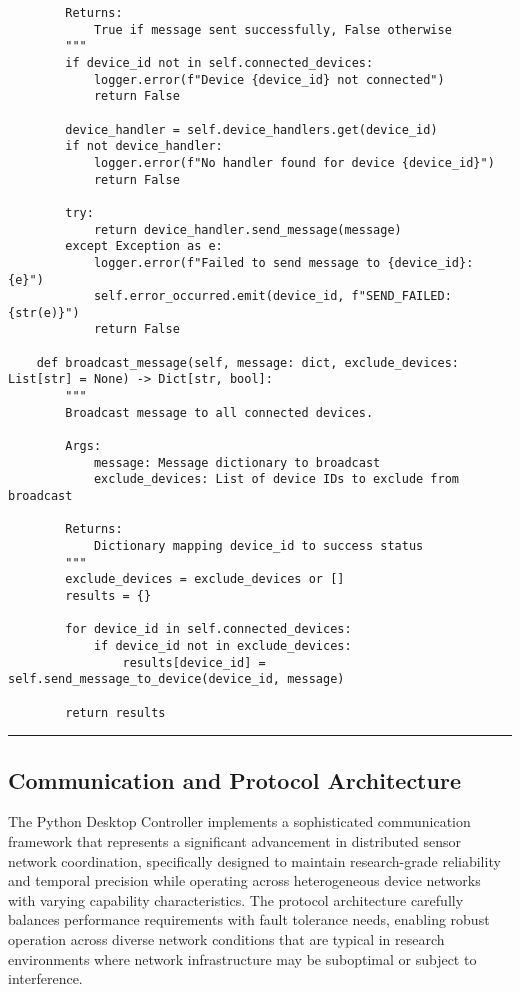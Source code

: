 \documentclass[11pt,a4paper]{article}
\begin{document}
\begin{verbatim}
        Returns:
            True if message sent successfully, False otherwise
        """
        if device_id not in self.connected_devices:
            logger.error(f"Device {device_id} not connected")
            return False

        device_handler = self.device_handlers.get(device_id)
        if not device_handler:
            logger.error(f"No handler found for device {device_id}")
            return False

        try:
            return device_handler.send_message(message)
        except Exception as e:
            logger.error(f"Failed to send message to {device_id}: {e}")
            self.error_occurred.emit(device_id, f"SEND_FAILED: {str(e)}")
            return False

    def broadcast_message(self, message: dict, exclude_devices: List[str] = None) -> Dict[str, bool]:
        """
        Broadcast message to all connected devices.

        Args:
            message: Message dictionary to broadcast
            exclude_devices: List of device IDs to exclude from broadcast

        Returns:
            Dictionary mapping device_id to success status
        """
        exclude_devices = exclude_devices or []
        results = {}

        for device_id in self.connected_devices:
            if device_id not in exclude_devices:
                results[device_id] = self.send_message_to_device(device_id, message)

        return results
\end{verbatim}

\hrule

\subsection{Communication and Protocol Architecture}

The Python Desktop Controller implements a sophisticated communication framework that represents a significant
advancement in distributed sensor network coordination, specifically designed to maintain research-grade reliability and
temporal precision while operating across heterogeneous device networks with varying capability characteristics. The
protocol architecture carefully balances performance requirements with fault tolerance needs, enabling robust operation
across diverse network conditions that are typical in research environments where network infrastructure may be
suboptimal or subject to interference.
\end{document}
